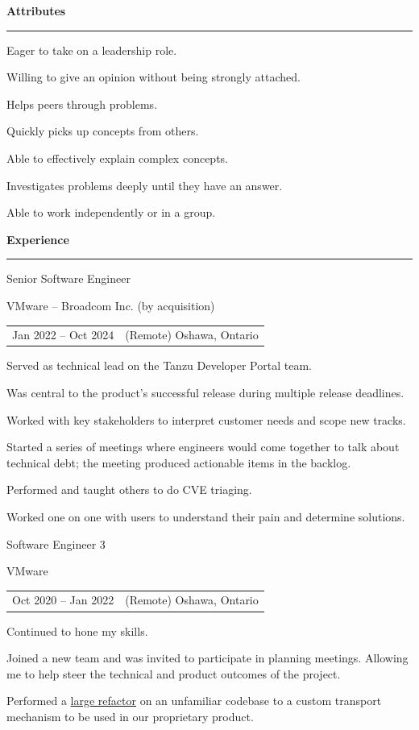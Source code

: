 \documentclass[letterpaper]{article}
\newcommand{\primary}{\color{primary}}
\newcommand{\primarydark}{\color{primarydark}}
\newcommand{\complementary}{\color{complementary}}
\newcommand{\mapMarker}{\faMapMarker*[alt]}
\newenvironment{heading}[1]{%
  {\LARGE \primarydark \textbf{#1}}\\ {\complementary
    \rule[5pt]{\linewidth}{0.6pt}}
}
{\par\vspace{8pt}}
\newcommand{\blockend}{\vspace{4pt}}
\newenvironment{experience}[4]{
  { #1 \par}
  {\small \primary #2 \par}
  \begin{tabularx}{\linewidth}{ l l }
    { \small \faCalendar \space #3 } & { \small \mapMarker \space #4 }
  \end{tabularx}%
}{
  \blockend{}
}
\newenvironment{itemize*}%
{\begin{itemize}[topsep=0pt,leftmargin=20pt]%
    \setlength{\itemsep}{0pt}%
    \setlength{\parsep}{0pt}%
    \setlength{\parskip}{0pt}%
    \small%
  }%
  {\end{itemize}}
\begin{document}
\begin{minipage}[t]{0.59\textwidth}%
  \begin{heading}{Attributes}
    \begin{itemize*}
    \item Eager to take on a leadership role.
    \item Willing to give an opinion without being strongly attached.
    \item Helps peers through problems.
    \item Quickly picks up concepts from others.
    \item Able to effectively explain complex concepts.
    \item Investigates problems deeply until they have an answer.
    \item Able to work independently or in a group.
    \end{itemize*}
  \end{heading}
  \begin{heading}{Experience}%
    \begin{experience}{Senior Software Engineer}
      {VMware -- Broadcom Inc. (by acquisition)}
      {Jan 2022 -- Oct 2024}
      {(Remote) Oshawa, Ontario}
      Served as technical lead on the Tanzu Developer Portal team.
      \begin{itemize*}
      \item Was central to the product's successful release during multiple
        release deadlines.
      \item Worked with key stakeholders to interpret customer needs and scope
        new tracks.
      \item Started a series of meetings where engineers would come together to
        talk about technical debt; the meeting produced actionable items in the
        backlog.
      \item Performed and taught others to do CVE triaging.
      \item Worked one on one with users to understand their pain and determine
        solutions.
      \end{itemize*}
    \end{experience}
    \begin{experience}{Software Engineer 3}
      {VMware}
      {Oct 2020 -- Jan 2022}
      {(Remote) Oshawa, Ontario}
      Continued to hone my skills.
      \begin{itemize*}
      \item Joined a new team and was invited to participate in planning
        meetings. Allowing me to help steer the technical and product outcomes
        of the project.
      \item Performed a
        \href{https://github.com/vmware-archive/octant/pull/2581}{large
          refactor} on an unfamiliar codebase to a custom transport mechanism to
        be used in our proprietary product.
      \end{itemize*}
    \end{experience}


\end{heading}
\end{minipage}
\end{document}
